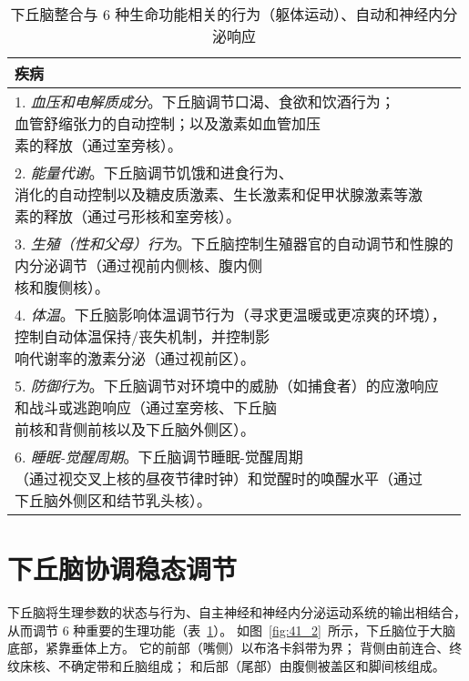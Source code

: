 \begin{table}[htbp]
	\caption{下丘脑整合与 6 种生命功能相关的行为（躯体运动）、自动和神经内分泌响应} \label{tab:41_1} \centering
	\begin{tabular}{l}
		\toprule
		疾病 \\
		\midrule
		\makecell[l]{1. \textit{血压和电解质成分}。下丘脑调节口渴、食欲和饮酒行为；\\血管舒缩张力的自动控制；以及激素如血管加压\\素的释放（通过室旁核）。}  \\
		\makecell[l]{2. \textit{能量代谢}。下丘脑调节饥饿和进食行为、\\消化的自动控制以及糖皮质激素、生长激素和促甲状腺激素等激\\素的释放（通过弓形核和室旁核）。}  \\
		\makecell[l]{3. \textit{生殖（性和父母）行为}。下丘脑控制生殖器官的自动调节和性腺的\\内分泌调节（通过视前内侧核、腹内侧\\核和腹侧核）。}  \\
		\makecell[l]{4. \textit{体温}。下丘脑影响体温调节行为（寻求更温暖或更凉爽的环境），\\控制自动体温保持/丧失机制，并控制影\\响代谢率的激素分泌（通过视前区）。}  \\
		\makecell[l]{5. \textit{防御行为}。下丘脑调节对环境中的威胁（如捕食者）的应激响应\\和战斗或逃跑响应（通过室旁核、下丘脑\\前核和背侧前核以及下丘脑外侧区）。}  \\
		\makecell[l]{6. \textit{睡眠-觉醒周期}。下丘脑调节睡眠-觉醒周期\\（通过视交叉上核的昼夜节律时钟）和觉醒时的唤醒水平（通过\\下丘脑外侧区和结节乳头核）。}  \\
		\bottomrule
	\end{tabular}
\end{table}

\section{下丘脑协调稳态调节}

下丘脑将生理参数的状态与行为、自主神经和神经内分泌运动系统的输出相结合，从而调节 6 种重要的生理功能（表~\ref{tab:41_1}）。
如图~\ref{fig:41_2}~所示，下丘脑位于大脑底部，紧靠垂体上方。
它的前部（嘴侧）以布洛卡斜带为界；
背侧由前连合、终纹床核、不确定带和丘脑组成；
和后部（尾部）由腹侧被盖区和脚间核组成。


